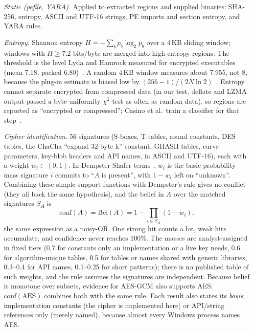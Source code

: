 \textit{Static (pefile, YARA).} Applied to extracted regions and supplied binaries: SHA-256, entropy,
ASCII and UTF-16 strings, PE imports and section entropy, and YARA rules.

\textit{Entropy.} Shannon entropy $H=-\sum_b p_b\log_2 p_b$ over a 4\,KB sliding window; windows with
$H\ge7.2$ bits/byte are merged into high-entropy regions. The threshold is the level Lyda and Hamrock
measured for encrypted executables (mean 7.18, packed 6.80)~\cite{lyda2007using}. A random 4\,KB window
measures about 7.955, not 8, because the plug-in estimate is biased low by $(256-1)/(2N\ln 2)$~\cite{miller1955note}.
Entropy cannot separate encrypted from compressed data (in our test, deflate and LZMA output passed a
byte-uniformity $\chi^2$ test as often as random data), so regions are reported as ``encrypted or
compressed''; Casino et al.\ train a classifier for that step~\cite{casino2025not}.

\textit{Cipher identification.} 56 signatures (S-boxes, T-tables, round constants, DES tables, the ChaCha
``expand 32-byte k'' constant, GHASH tables, curve parameters, key-blob headers and API names, in ASCII
and UTF-16), each with a weight $w_i\in(0,1)$. In Dempster-Shafer terms~\cite{shafer1976mathematical},
$w_i$ is the basic probability mass signature $i$ commits to ``$A$ is present'', with $1-w_i$ left on
``unknown''. Combining these simple support functions with Dempster's rule gives no conflict (they all back the
same hypothesis), and the belief in $A$ over the matched signatures $S_A$ is
\begin{equation}
  \mathrm{conf}(A) = \mathrm{Bel}(A) = 1 - \prod_{i\in S_A}(1-w_i),
\end{equation}
the same expression as a noisy-OR. One strong hit counts a lot, weak hits accumulate, and confidence never
reaches 100\%. The masses are analyst-assigned in fixed tiers (0.7 for constants only an implementation or a
live key needs, 0.6 for algorithm-unique tables, 0.5 for tables or names shared with generic libraries,
0.3--0.4 for API names, 0.1--0.25 for short patterns); there is no published table of such weights, and the
rule assumes the signatures are independent. Because belief is monotone over subsets, evidence for AES-GCM
also supports AES: $\mathrm{conf}(\text{AES})$ combines both with the same rule. Each result also
states its \emph{basis}: implementation constants (the cipher is implemented here) or API/string references
only (merely named), because almost every Windows process names AES.

